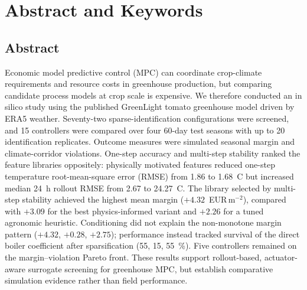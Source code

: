 \section{Abstract and Keywords}
\label{sec:abstract}


\subsection{Abstract}

Economic model predictive control (MPC) can coordinate crop-climate requirements
and resource costs in greenhouse production, but comparing candidate process
models at crop scale is expensive. We therefore conducted an in silico study using
the published GreenLight tomato greenhouse model driven by ERA5 weather. Seventy-two
sparse-identification configurations were screened, and 15 controllers were
compared over four 60-day test seasons with up to 20 identification replicates.
Outcome measures were simulated seasonal margin and climate-corridor violations. One-step
accuracy and multi-step stability ranked the feature libraries oppositely:
physically motivated features reduced one-step temperature root-mean-square error
(RMSE) from 1.86 to
1.68~\textdegree C but increased median 24~h rollout RMSE from 2.67 to
24.27~\textdegree C. The library selected by multi-step stability achieved the
highest mean margin ($+4.32$~EUR\,m$^{-2}$), compared with $+3.09$ for the best
physics-informed variant and $+2.26$ for a tuned agronomic heuristic. Conditioning
did not explain the non-monotone margin pattern ($+4.32$, $+0.28$, $+2.75$);
performance instead tracked survival of the direct boiler coefficient after
sparsification (55, 15, 55~\%). Five controllers remained on the margin--violation
Pareto front. These results support rollout-based, actuator-aware surrogate
screening for greenhouse MPC, but establish comparative simulation evidence rather
than field performance.

